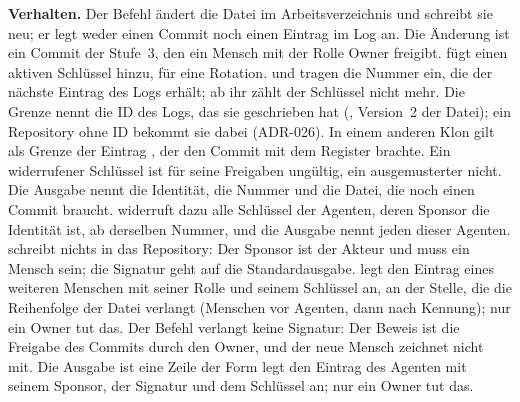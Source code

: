 {\bf Verhalten.} Der Befehl ändert die Datei  im
Arbeitsverzeichnis und schreibt sie neu; er legt weder einen Commit noch einen Eintrag im Log an.
Die Änderung ist ein Commit der Stufe~3, den ein Mensch mit der Rolle Owner freigibt.
 fügt einen aktiven Schlüssel hinzu, für eine Rotation.
 und  tragen die Nummer ein, die der nächste Eintrag des Logs
erhält; ab ihr zählt der Schlüssel nicht mehr.
Die Grenze nennt die ID des Logs, das sie geschrieben hat (, Version~2 der Datei);
ein Repository ohne ID bekommt sie dabei (ADR-026).
In einem anderen Klon gilt als Grenze der Eintrag , der den Commit mit dem Register
brachte.
Ein widerrufener Schlüssel ist für seine Freigaben ungültig, ein ausgemusterter nicht.
Die Ausgabe nennt die Identität, die Nummer und die Datei, die noch einen Commit braucht.
 widerruft dazu alle Schlüssel der Agenten, deren Sponsor die Identität ist,
ab derselben Nummer, und die Ausgabe nennt jeden dieser Agenten.
 schreibt nichts in das Repository: Der Sponsor ist der Akteur und muss ein Mensch
sein; die Signatur geht auf die Standardausgabe.
 legt den Eintrag eines weiteren Menschen mit seiner Rolle und seinem
Schlüssel an, an der Stelle, die die Reihenfolge der Datei verlangt (Menschen vor Agenten,
dann nach Kennung); nur ein Owner tut das.
Der Befehl verlangt keine Signatur: Der Beweis ist die Freigabe des Commits durch den Owner,
und der neue Mensch zeichnet nicht mit.
Die Ausgabe ist eine Zeile der Form
 legt den Eintrag des Agenten mit seinem Sponsor, der Signatur
und dem Schlüssel an; nur ein Owner tut das.

